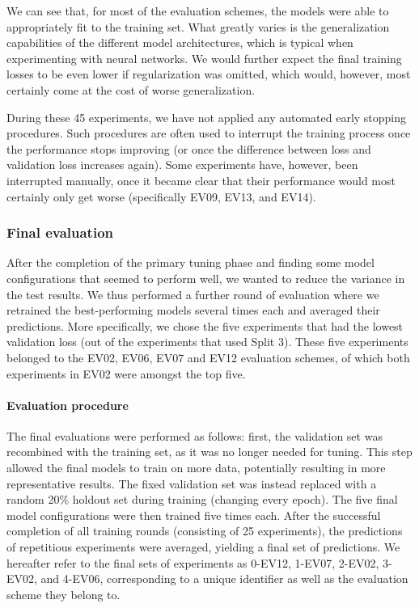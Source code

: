 We can see that, for most of the evaluation schemes, the models were able to appropriately fit to the training set. What greatly varies is the generalization capabilities of the different model architectures, which is typical when experimenting with neural networks. We would further expect the final training losses to be even lower if regularization was omitted, which would, however, most certainly come at the cost of worse generalization.

During these 45 experiments, we have not applied any automated early stopping procedures. Such procedures are often used to interrupt the training process once the performance stops improving (or once the difference between loss and validation loss increases again). Some experiments have, however, been interrupted manually, once it became clear that their performance would most certainly only get worse (specifically EV09, EV13, and EV14).

\subsubsection{Final evaluation}
After the completion of the primary tuning phase and finding some model configurations that seemed to perform well, we wanted to reduce the variance in the test results. We thus performed a further round of evaluation where we retrained the best-performing models several times each and averaged their predictions. More specifically, we chose the five experiments that had the lowest validation loss (out of the experiments that used Split 3). These five experiments belonged to the EV02, EV06, EV07 and EV12 evaluation schemes, of which both experiments in EV02 were amongst the top five.

\paragraph{Evaluation procedure}
The final evaluations were performed as follows: first, the validation set was recombined with the training set, as it was no longer needed for tuning. This step allowed the final models to train on more data, potentially resulting in more representative results. The fixed validation set was instead replaced with a random 20\% holdout set during training (changing every epoch). The five final model configurations were then trained five times each. After the successful completion of all training rounds (consisting of 25 experiments), the predictions of repetitious experiments were averaged, yielding a final set of predictions. We hereafter refer to the final sets of experiments as 0-EV12, 1-EV07, 2-EV02, 3-EV02, and 4-EV06, corresponding to a unique identifier as well as the evaluation scheme they belong to.


